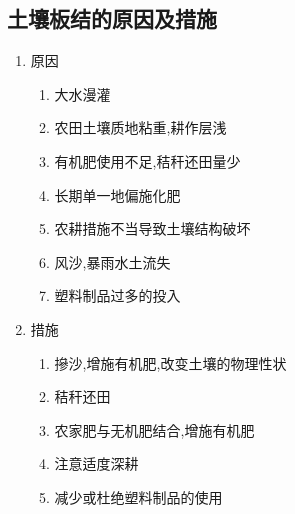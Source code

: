 \documentclass[a4paper]{article}
\begin{document}
    \subsection{土壤板结的原因及措施}
    \begin{enumerate}
        \item 原因
        \begin{enumerate}
            \item 大水漫灌
            \item 农田土壤质地粘重,耕作层浅
            \item 有机肥使用不足,秸秆还田量少
            \item 长期单一地偏施化肥
            \item 农耕措施不当导致土壤结构破坏
            \item 风沙,暴雨水土流失
            \item 塑料制品过多的投入
        \end{enumerate}
        \item 措施
        \begin{enumerate}
            \item 摻沙,增施有机肥,改变土壤的物理性状
            \item 秸秆还田
            \item 农家肥与无机肥结合,增施有机肥
            \item 注意适度深耕
            \item 减少或杜绝塑料制品的使用
        \end{enumerate}
    \end{enumerate}
\end{document}
